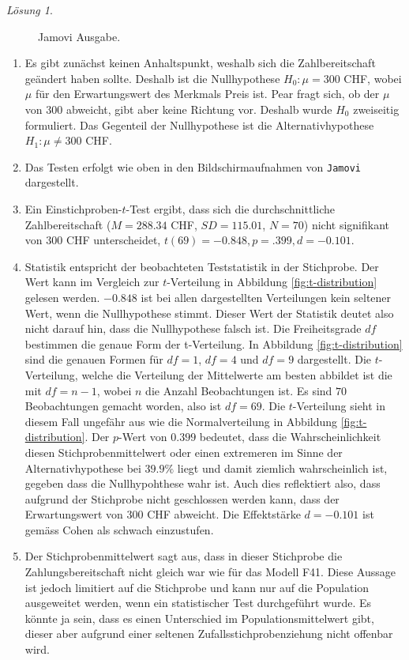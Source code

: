 \documentclass[
]{book}
\providecommand{\tightlist}{%
  \setlength{\itemsep}{0pt}\setlength{\parskip}{0pt}}
\theoremstyle{definition}
\theoremstyle{definition}
\theoremstyle{definition}
\theoremstyle{definition}
\theoremstyle{remark}
\newtheorem*{solution}{Lösung}
\begin{document}
\begin{solution}
\begin{figure}
{}

\caption{Jamovi Ausgabe.}\label{fig:sol-marktpreisanalyse-testen-output}
\end{figure}

\begin{enumerate}
\def\labelenumi{\alph{enumi})}
\tightlist
\item
  Es gibt zunächst keinen Anhaltspunkt, weshalb sich die Zahlbereitschaft geändert haben sollte. Deshalb ist die Nullhypothese \(H_0: \mu = 300\) CHF, wobei \(\mu\) für den Erwartungswert des Merkmals Preis ist. Pear fragt sich, ob der \(\mu\) von \(300\) abweicht, gibt aber keine Richtung vor. Deshalb wurde \(H_0\) zweiseitig formuliert. Das Gegenteil der Nullhypothese ist die Alternativhypothese \(H_1: \mu \neq 300\) CHF.
\item
  Das Testen erfolgt wie oben in den Bildschirmaufnahmen von \texttt{Jamovi} dargestellt.
\item
  Ein Einstichproben-\(t\)-Test ergibt, dass sich die durchschnittliche Zahlbereitschaft (\(M=288.34\) CHF, \(SD = 115.01\), \(N = 70\)) nicht signifikant von \(300\) CHF unterscheidet, \(t(69)= -0.848, p = .399, d = -0.101\).
\item
  Statistik entspricht der beobachteten Teststatistik in der Stichprobe. Der Wert kann im Vergleich zur \(t\)-Verteilung in Abbildung \ref{fig:t-distribution} gelesen werden. \(-0.848\) ist bei allen dargestellten Verteilungen kein seltener Wert, wenn die Nullhypothese stimmt. Dieser Wert der Statistik deutet also nicht darauf hin, dass die Nullhypothese falsch ist. Die Freiheitsgrade \(df\) bestimmen die genaue Form der t-Verteilung. In Abbildung \ref{fig:t-distribution} sind die genauen Formen für \(df = 1\), \(df = 4\) und \(df = 9\) dargestellt. Die \(t\)-Verteilung, welche die Verteilung der Mittelwerte am besten abbildet ist die mit \(df = n-1\), wobei \(n\) die Anzahl Beobachtungen ist. Es sind \(70\) Beobachtungen gemacht worden, also ist \(df = 69\). Die \(t\)-Verteilung sieht in diesem Fall ungefähr aus wie die Normalverteilung in Abbildung \ref{fig:t-distribution}. Der \(p\)-Wert von \(0.399\) bedeutet, dass die Wahrscheinlichkeit diesen Stichprobenmittelwert oder einen extremeren im Sinne der Alternativhypothese bei \(39.9\%\) liegt und damit ziemlich wahrscheinlich ist, gegeben dass die Nullhypohthese wahr ist. Auch dies reflektiert also, dass aufgrund der Stichprobe nicht geschlossen werden kann, dass der Erwartungswert von \(300\) CHF abweicht. Die Effektstärke \(d= -0.101\) ist gemäss Cohen als schwach einzustufen.
\item
  Der Stichprobenmittelwert sagt aus, dass in dieser Stichprobe die Zahlungsbereitschaft nicht gleich war wie für das Modell F41. Diese Aussage ist jedoch limitiert auf die Stichprobe und kann nur auf die Population ausgeweitet werden, wenn ein statistischer Test durchgeführt wurde. Es könnte ja sein, dass es einen Unterschied im Populationsmittelwert gibt, dieser aber aufgrund einer seltenen Zufallsstichprobenziehung nicht offenbar wird.
\end{enumerate}

\end{solution}
\end{document}
